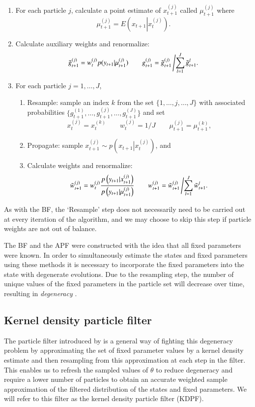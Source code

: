 \documentclass{elsarticle}
\begin{document}
\begin{enumerate}
\item For each particle $j$, calculate a point estimate of $x_{t+1}^{(j)}$ called $\mu_{t+1}^{(j)}$ where
\[ \mu_{t+1}^{(j)} = E\left(x_{t+1}\left|x_t^{(j)} \right.\right). \]
\item Calculate auxiliary weights and renormalize:
\[ \tilde{g}_{t+1}^{(j)} = w_t^{(j)} p(y_{t+1}|\mu_{t+1}^{(j)}) \qquad g_{t+1}^{(j)} = \tilde{g}_{t+1}^{(j)}\left/\sum_{l=1}^J \tilde{g}_{t+1}^l.\right. \]
\item For each particle $j=1,\ldots,J$,
	\begin{enumerate}
    \item Resample: sample an index $k$ from the set $\{1,\ldots,j,\ldots,J\}$ with associated probabilities $\{g_{t+1}^{(1)},\ldots,g_{t+1}^{(j)},\ldots,g_{t+1}^{(J)}\}$ and set
         \[ x_t^{(j)} = x_t^{(k)} \qquad w_t^{(j)} = 1 / J \qquad \mu_{t+1}^{(j)} = \mu_{t+1}^{(k)}, \]
	\item Propagate: sample $x_{t+1}^{(j)} \sim p\left(\left. x_{t+1}\right|x_t^{(j)}\right)$, and
	\item Calculate weights and renormalize:
\[ \tilde{w}_{t+1}^{(j)} = w_t^{(j)}\frac{p\left(y_{t+1}|x_{t+1}^{(j)}\right)}{p\left(y_{t+1}|\mu_{t+1}^{(j)}\right)} \qquad w_{t+1}^{(j)} = \tilde{w}_{t+1}^{(j)}\left/\sum_{l=1}^J \tilde{w}_{t+1}^l. \right. \]
	\end{enumerate}
\end{enumerate}

\noindent As with the BF, the `Resample' step does not necessarily need to be carried out at every iteration of the algorithm, and we may choose to skip this step if particle weights are not out of balance.

The BF and the APF were constructed with the idea that all fixed parameters were known. In order to simultaneously estimate the states and fixed parameters using these methods it is necessary to incorporate the fixed parameters into the state with degenerate evolutions. Due to the resampling step, the number of unique values of the fixed parameters in the particle set will decrease over time, resulting in \emph{degeneracy} \citep{Liu:West:comb:2001}.

\subsection{Kernel density particle filter \label{sec:kd}}

The particle filter introduced by \citet{Liu:West:comb:2001} is a general way of fighting this degeneracy problem by approximating the set of fixed parameter values by a kernel density estimate and then resampling from this approximation at each step in the filter. This enables us to refresh the sampled values of $\theta$ to reduce degeneracy and require a lower number of particles to obtain an accurate weighted sample approximation of the filtered distribution of the states and fixed parameters. We will refer to this filter as the kernel density particle filter (KDPF).
\end{document}
